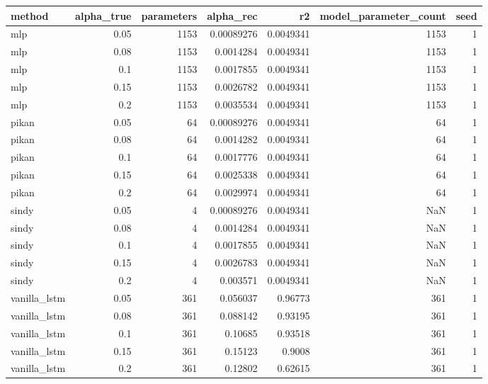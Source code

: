 \begin{tabular}{lrrrrrr}
\toprule
method & alpha\_true & parameters & alpha\_rec & r2 & model\_parameter\_count & seed \\
\midrule
mlp & 0.05 & 1153 & 0.00089276 & 0.0049341 & 1153 & 1 \\
mlp & 0.08 & 1153 & 0.0014284 & 0.0049341 & 1153 & 1 \\
mlp & 0.1 & 1153 & 0.0017855 & 0.0049341 & 1153 & 1 \\
mlp & 0.15 & 1153 & 0.0026782 & 0.0049341 & 1153 & 1 \\
mlp & 0.2 & 1153 & 0.0035534 & 0.0049341 & 1153 & 1 \\
pikan & 0.05 & 64 & 0.00089276 & 0.0049341 & 64 & 1 \\
pikan & 0.08 & 64 & 0.0014282 & 0.0049341 & 64 & 1 \\
pikan & 0.1 & 64 & 0.0017776 & 0.0049341 & 64 & 1 \\
pikan & 0.15 & 64 & 0.0025338 & 0.0049341 & 64 & 1 \\
pikan & 0.2 & 64 & 0.0029974 & 0.0049341 & 64 & 1 \\
sindy & 0.05 & 4 & 0.00089276 & 0.0049341 & NaN & 1 \\
sindy & 0.08 & 4 & 0.0014284 & 0.0049341 & NaN & 1 \\
sindy & 0.1 & 4 & 0.0017855 & 0.0049341 & NaN & 1 \\
sindy & 0.15 & 4 & 0.0026783 & 0.0049341 & NaN & 1 \\
sindy & 0.2 & 4 & 0.003571 & 0.0049341 & NaN & 1 \\
vanilla\_lstm & 0.05 & 361 & 0.056037 & 0.96773 & 361 & 1 \\
vanilla\_lstm & 0.08 & 361 & 0.088142 & 0.93195 & 361 & 1 \\
vanilla\_lstm & 0.1 & 361 & 0.10685 & 0.93518 & 361 & 1 \\
vanilla\_lstm & 0.15 & 361 & 0.15123 & 0.9008 & 361 & 1 \\
vanilla\_lstm & 0.2 & 361 & 0.12802 & 0.62615 & 361 & 1 \\
\bottomrule
\end{tabular}
